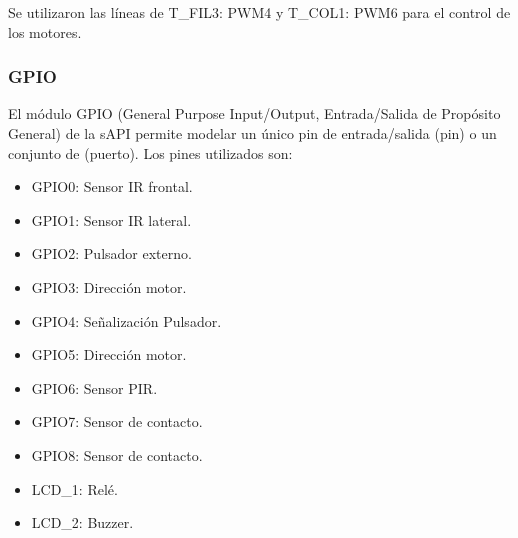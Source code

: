 Se utilizaron las líneas de T\_FIL3: PWM4 y T\_COL1: PWM6 para el control de los motores.



		\subsubsection{GPIO}

El módulo GPIO (General Purpose Input/Output, Entrada/Salida de Propósito General) de la sAPI permite modelar un único pin de entrada/salida (pin) o un conjunto de  (puerto).
Los pines utilizados son:

\begin{itemize}
	\item GPIO0:  	Sensor IR frontal.
	\item GPIO1:  	Sensor IR lateral.
	\item GPIO2:  	Pulsador externo.
	\item GPIO3:  	Dirección motor.	
	\item GPIO4:  	Señalización Pulsador.
	\item GPIO5:  	Dirección motor.		
	\item GPIO6:  	Sensor PIR. 
	\item GPIO7:  	Sensor de contacto. 
	\item GPIO8:  	Sensor de contacto. 
	\item LCD\_1:  	Relé.
	\item LCD\_2:  	Buzzer.		
\end{itemize}










